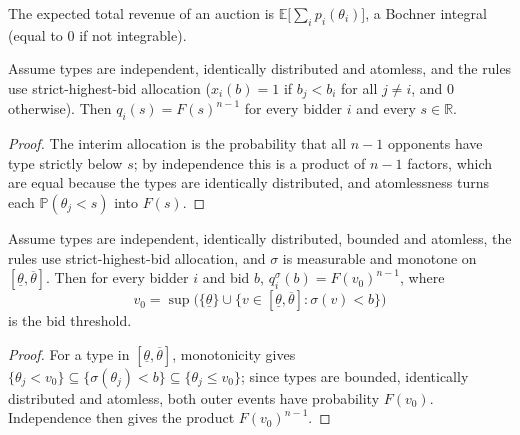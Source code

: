 \begin{definition}\label{def:MathEconLib.Auction.expectedRevenue}\leanok
{}
The expected total revenue of an auction is $\mathbb{E}\bigl[\sum_i p_i(\theta_i)\bigr]$, a Bochner integral (equal to $0$ if not integrable).
\end{definition}

\begin{lemma}\label{thm:MathEconLib.Auction.q_eq_pow}\leanok
{}
Assume types are independent, identically distributed and atomless, and the rules use strict-highest-bid allocation ($x_i(b)=1$ if $b_j<b_i$ for all $j\ne i$, and $0$ otherwise). Then $q_i(s)=F(s)^{n-1}$ for every bidder $i$ and every $s\in\mathbb{R}$.
\end{lemma}
\begin{proof}\leanok
The interim allocation is the probability that all $n-1$ opponents have type strictly below $s$; by independence this is a product of $n-1$ factors, which are equal because the types are identically distributed, and atomlessness turns each $\mathbb{P}(\theta_j<s)$ into $F(s)$.
\end{proof}

\begin{lemma}\label{thm:MathEconLib.Auction.q_strat_eq_cdf_pow}\leanok
{}
Assume types are independent, identically distributed, bounded and atomless, the rules use strict-highest-bid allocation, and $\sigma$ is measurable and monotone on $[\underline\theta,\overline\theta]$. Then for every bidder $i$ and bid $b$, $q^\sigma_i(b)=F(v_0)^{n-1}$, where
\[
v_0=\sup\bigl(\{\underline\theta\}\cup\{v\in[\underline\theta,\overline\theta]:\sigma(v)<b\}\bigr)
\]
is the bid threshold.
\end{lemma}
\begin{proof}\leanok
For a type in $[\underline\theta,\overline\theta]$, monotonicity gives $\{\theta_j<v_0\}\subseteq\{\sigma(\theta_j)<b\}\subseteq\{\theta_j\le v_0\}$; since types are bounded, identically distributed and atomless, both outer events have probability $F(v_0)$. Independence then gives the product $F(v_0)^{n-1}$.
\end{proof}

